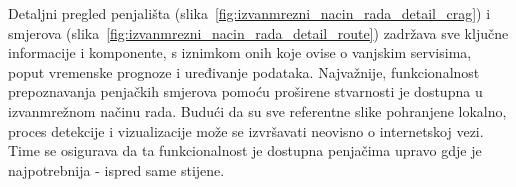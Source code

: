 Detaljni pregled penjališta (slika~\ref{fig:izvanmrezni_nacin_rada_detail_crag}) i smjerova (slika~\ref{fig:izvanmrezni_nacin_rada_detail_route}) zadržava sve ključne informacije i komponente, s iznimkom onih koje ovise o vanjskim servisima, poput vremenske prognoze i uređivanje podataka.
Najvažnije, funkcionalnost prepoznavanja penjačkih smjerova pomoću proširene stvarnosti je dostupna u izvanmrežnom načinu rada. Budući da su sve referentne slike pohranjene lokalno, proces detekcije i vizualizacije može se izvršavati neovisno o internetskoj vezi. Time se osigurava da ta funkcionalnost je dostupna penjačima upravo gdje je najpotrebnija - ispred same stijene.
